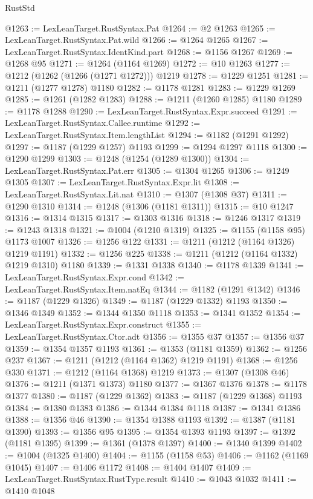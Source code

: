 \begin{lexlean}{RustStd}
\begin{coremodule}
{\begin{coremodule}
{{{{{{{{{{{{{{{{{{{{{{{{{{{{{{{{@1263 := LexLeanTarget.RustSyntax.Pat
@1264 := @2 @1263
@1265 := LexLeanTarget.RustSyntax.Pat.wild
@1266 := @1264 @1265
@1267 := LexLeanTarget.RustSyntax.IdentKind.part
@1268 := @1156 @1267
@1269 := @1268 @95
@1271 := @1264 (@1164 @1269)
@1272 := @10 @1263
@1277 := @1212 (@1262 (@1266 (@1271 @1272))) @1219
@1278 := @1229 @1251
@1281 := @1211 (@1277 @1278) @1180
@1282 := @1178 @1281
@1283 := @1229 @1269
@1285 := @1261 (@1282 @1283)
@1288 := @1211 (@1260 @1285) @1180
@1289 := @1178 @1288
@1290 := LexLeanTarget.RustSyntax.Expr.succeed
@1291 := LexLeanTarget.RustSyntax.Callee.runtime
@1292 := LexLeanTarget.RustSyntax.Item.lengthList
@1294 := @1182 (@1291 @1292)
@1297 := @1187 (@1229 @1257) @1193
@1299 := @1294 @1297 @1118
@1300 := @1290 @1299
@1303 := @1248 (@1254 (@1289 @1300))
@1304 := LexLeanTarget.RustSyntax.Pat.err
@1305 := @1304 @1265
@1306 := @1249 @1305
@1307 := LexLeanTarget.RustSyntax.Expr.lit
@1308 := LexLeanTarget.RustSyntax.Lit.nat
@1310 := @1307 (@1308 @37)
@1311 := @1290 @1310
@1314 := @1248 (@1306 (@1181 @1311))
@1315 := @10 @1247
@1316 := @1314 @1315
@1317 := @1303 @1316
@1318 := @1246 @1317
@1319 := @1243 @1318
@1321 := @1004 (@1210 @1319)
@1325 := @1155 (@1158 @95) @1173 @1007
@1326 := @1256 @122
@1331 := @1211 (@1212 (@1164 @1326) @1219 @1191)
@1332 := @1256 @225
@1338 := @1211 (@1212 (@1164 @1332) @1219 @1310) @1180
@1339 := @1331 @1338
@1340 := @1178 @1339
@1341 := LexLeanTarget.RustSyntax.Expr.cond
@1342 := LexLeanTarget.RustSyntax.Item.natEq
@1344 := @1182 (@1291 @1342)
@1346 := @1187 (@1229 @1326)
@1349 := @1187 (@1229 @1332) @1193
@1350 := @1346 @1349
@1352 := @1344 @1350 @1118
@1353 := @1341 @1352
@1354 := LexLeanTarget.RustSyntax.Expr.construct
@1355 := LexLeanTarget.RustSyntax.Ctor.adt
@1356 := @1355 @37
@1357 := @1356 @37
@1359 := @1354 @1357 @1193
@1361 := @1353 (@1181 @1359)
@1362 := @1256 @237
@1367 := @1211 (@1212 (@1164 @1362) @1219 @1191)
@1368 := @1256 @330
@1371 := @1212 (@1164 @1368) @1219
@1373 := @1307 (@1308 @46)
@1376 := @1211 (@1371 @1373) @1180
@1377 := @1367 @1376
@1378 := @1178 @1377
@1380 := @1187 (@1229 @1362)
@1383 := @1187 (@1229 @1368) @1193
@1384 := @1380 @1383
@1386 := @1344 @1384 @1118
@1387 := @1341 @1386
@1388 := @1356 @46
@1390 := @1354 @1388 @1193
@1392 := @1387 (@1181 @1390)
@1393 := @1356 @95
@1395 := @1354 @1393 @1193
@1397 := @1392 (@1181 @1395)
@1399 := @1361 (@1378 @1397)
@1400 := @1340 @1399
@1402 := @1004 (@1325 @1400)
@1404 := @1155 (@1158 @53)
@1406 := @1162 (@1169 @1045)
@1407 := @1406 @1172
@1408 := @1404 @1407
@1409 := LexLeanTarget.RustSyntax.RustType.result
@1410 := @1043 @1032
@1411 := @1410 @1048
}}}}}}}}}}}}}}}}}}}}}}}}}}}}}}}}
\end{coremodule}}
\end{coremodule}
\end{lexlean}
